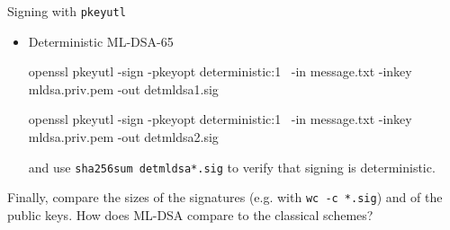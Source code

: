\documentclass{practice}
\begin{document}
\begin{task}{Signing with \texttt{pkeyutl}}
\begin{itemize}
\begin{cmdblock}
openssl pkeyutl -sign \
  -in message.txt -inkey mldsa.priv.pem -out mldsa2.sig
    \end{cmdblock}
    and use \texttt{sha256sum mldsa*.sig} to verify that ML-DSA is probabilistic (\enquote{hedged}) by default.

    \item Deterministic ML-DSA-65
    \begin{cmdblock}
openssl pkeyutl -sign -pkeyopt deterministic:1 \
  -in message.txt -inkey mldsa.priv.pem -out detmldsa1.sig

openssl pkeyutl -sign -pkeyopt deterministic:1 \
  -in message.txt -inkey mldsa.priv.pem -out detmldsa2.sig
    \end{cmdblock}
    and use \texttt{sha256sum detmldsa*.sig} to verify that signing is deterministic.
  \end{itemize}

  Finally, compare the sizes of the signatures (e.g. with \texttt{wc -c *.sig}) and of the public keys.
  How does ML-DSA compare to the classical schemes?
\end{task}
\end{document}
